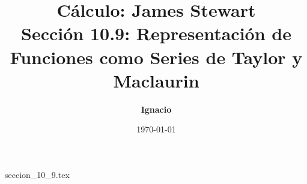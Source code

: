 \documentclass[11pt,spanish,oneside]{report}
\title{\textbf{Cálculo: James Stewart} \\ \Large Sección 10.9: Representación de Funciones como Series de Taylor y Maclaurin}
\author{\textbf{Ignacio}}
\date{\today}
\begin{document}
\maketitle

{seccion_10_9.tex}
\end{document}
